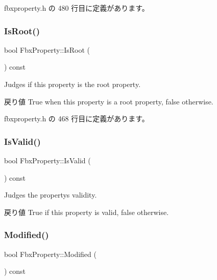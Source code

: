  fbxproperty.\+h の 480 行目に定義があります。

\mbox{\label{class_fbx_property_ac614dd09edb00ac99ce49332a66a597d}} 
\subsubsection{\texorpdfstring{Is\+Root()}{IsRoot()}}
{\footnotesize\ttfamily bool Fbx\+Property\+::\+Is\+Root (\begin{DoxyParamCaption}{ }\end{DoxyParamCaption}) const\hspace{0.3cm}{\ttfamily [inline]}}

Judges if this property is the root property. \begin{DoxyReturn}{戻り値}
{\ttfamily True} when this property is a root property, {\ttfamily false} otherwise. 
\end{DoxyReturn}


 fbxproperty.\+h の 468 行目に定義があります。

\mbox{\label{class_fbx_property_a1c40042c55d1f4a1d4837f06fbc1d764}} 
\subsubsection{\texorpdfstring{Is\+Valid()}{IsValid()}}
{\footnotesize\ttfamily bool Fbx\+Property\+::\+Is\+Valid (\begin{DoxyParamCaption}{ }\end{DoxyParamCaption}) const}

Judges the property\textquotesingle{}s validity. \begin{DoxyReturn}{戻り値}
{\ttfamily True} if this property is valid, {\ttfamily false} otherwise. 
\end{DoxyReturn}
\mbox{\label{class_fbx_property_acea8ef5412320c293dfaca9680bc797b}} 
\subsubsection{\texorpdfstring{Modified()}{Modified()}}
{\footnotesize\ttfamily bool Fbx\+Property\+::\+Modified (\begin{DoxyParamCaption}{ }\end{DoxyParamCaption}) const}

